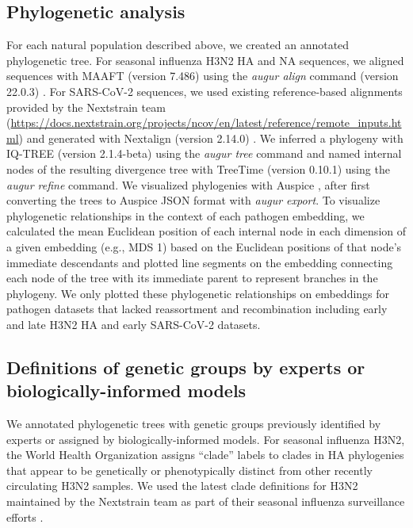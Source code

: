 \documentclass[10pt,letterpaper]{article}
\begin{document}
\subsection*{Phylogenetic analysis}

For each natural population described above, we created an annotated phylogenetic tree.
For seasonal influenza H3N2 HA and NA sequences, we aligned sequences with MAAFT (version 7.486) \cite{Katoh2002,Katoh2013} using the \textit{augur align} command (version 22.0.3) \cite{Huddleston2021}.
For SARS-CoV-2 sequences, we used existing reference-based alignments provided by the Nextstrain team (\href{https://docs.nextstrain.org/projects/ncov/en/latest/reference/remote_inputs.html#summary-of-available-genbank-open-files}{https://docs.nextstrain.org/projects/ncov/en/latest/reference/remote\_inputs.html}) and generated with Nextalign (version 2.14.0) \cite{Aksamentov2021}.
We inferred a phylogeny with IQ-TREE (version 2.1.4-beta) \cite{Nguyen2014} using the \textit{augur tree} command and named internal nodes of the resulting divergence tree with TreeTime (version 0.10.1) \cite{Sagulenko2018} using the \textit{augur refine} command.
We visualized phylogenies with Auspice \cite{Hadfield2018}, after first converting the trees to Auspice JSON format with \textit{augur export}.
To visualize phylogenetic relationships in the context of each pathogen embedding, we calculated the mean Euclidean position of each internal node in each dimension of a given embedding (e.g., MDS 1) based on the Euclidean positions of that node's immediate descendants and plotted line segments on the embedding connecting each node of the tree with its immediate parent to represent branches in the phylogeny.
We only plotted these phylogenetic relationships on embeddings for pathogen datasets that lacked reassortment and recombination including early and late H3N2 HA and early SARS-CoV-2 datasets.

\subsection*{Definitions of genetic groups by experts or biologically-informed models}

We annotated phylogenetic trees with genetic groups previously identified by experts or assigned by biologically-informed models.
For seasonal influenza H3N2, the World Health Organization assigns ``clade'' labels to clades in HA phylogenies that appear to be genetically or phenotypically distinct from other recently circulating H3N2 samples.
We used the latest clade definitions for H3N2 maintained by the Nextstrain team as part of their seasonal influenza surveillance efforts \cite{Neher2015}.
\end{document}
